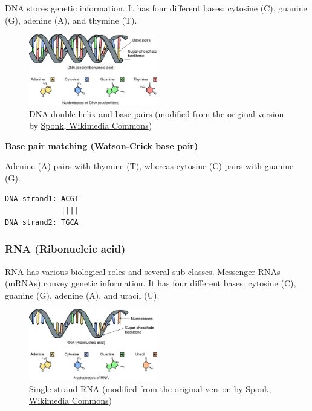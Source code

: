 DNA stores genetic information. It has four different bases: cytosine (C), guanine (G), adenine (A), and thymine (T).

\begin{figure}[H]
  \centering
      \includegraphics[width=0.5\textwidth]{fig01/dna_bases.png}
  \caption{DNA double helix and base pairs \newline (modified from the original version by \href{https://commons.wikimedia.org/w/index.php?curid=9810855}{Sponk, Wikimedia Commons})}
\end{figure} 

\noindent \textbf{Base pair matching (Watson-Crick base pair)}

\noindent Adenine (A) pairs with thymine (T), whereas cytosine (C) pairs with guanine (G).

\begin{verbatim}
DNA strand1: ACGT
             ||||
DNA strand2: TGCA
\end{verbatim}
	
%
%
\subsubsection*{RNA (Ribonucleic acid)}
RNA has various biological roles and several sub-classes. Messenger RNAs (mRNAs) convey genetic information.  It has four different bases: cytosine (C), guanine (G), adenine (A), and uracil (U).

\begin{figure}[H]
  \centering
      \includegraphics[width=0.5\textwidth]{fig01/rna_bases.png}
  \caption{Single strand RNA \newline (modified from the original version by \href{https://commons.wikimedia.org/w/index.php?curid=9810855}{Sponk, Wikimedia Commons})}
\end{figure}

